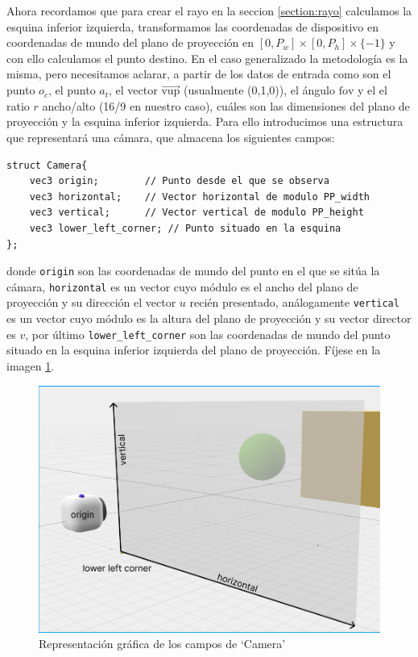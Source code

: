 Ahora recordamos que para crear el rayo en la seccion \ref{section:rayo} calculamos la esquina inferior izquierda, transformamos las coordenadas de dispositivo en coordenadas de mundo del plano de proyección en $[0,P_w]\times[0,P_h]\times\{-1\}$ y con ello calculamos el punto destino. En el caso generalizado la metodología es la misma, pero necesitamos aclarar, a partir de los datos de entrada como son el punto $o_c$, el punto $a_t$, el vector $\overrightarrow{\mathrm{vup}}$ (usualmente (0,1,0)), el ángulo $\widehat{\mathrm{fov}}$ y el el ratio $r$ ancho/alto (16/9 en nuestro caso), cuáles son las dimensiones del plano de proyección y la esquina inferior izquierda. Para ello introducimos una estructura que representará una cámara, que almacena los siguientes campos:

\begin{lstlisting}
struct Camera{
    vec3 origin;        // Punto desde el que se observa
    vec3 horizontal;    // Vector horizontal de modulo PP_width
    vec3 vertical;      // Vector vertical de modulo PP_height
    vec3 lower_left_corner; // Punto situado en la esquina
};
\end{lstlisting}
donde \verb|origin| son las coordenadas de mundo del punto en el que se sitúa la cámara, \verb|horizontal| es un vector cuyo módulo es el ancho del plano de proyección y su dirección el vector $u$ recién presentado, análogamente \verb|vertical| es un vector cuyo módulo es la altura del plano de proyección y su vector director es $v$, por último \verb|lower_left_corner| son las coordenadas de mundo del punto situado en la esquina inferior izquierda del plano de proyección. Fíjese en la imagen \ref{fig:camera-fields}.

\begin{figure} [ht]
    \centering
    \includegraphics[scale = 0.3]{img/C7/camera-fields.png}
    \caption{Representación gráfica de los campos de `Camera'}
    \label{fig:camera-fields}
\end{figure}


